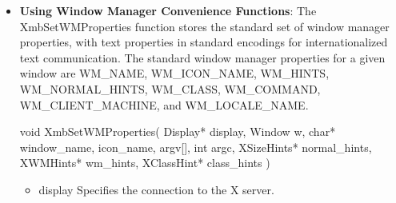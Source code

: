 \documentclass{report}
\begin{document}
\begin{itemize}
\begin{itemize}
            \bigbreak \noindent 
            To read a window’s WM\_ICON\_SIZE property, use XGetIconSizes
            \bigbreak \noindent 
            \begin{cppcode}
                Status XGetIconSizes(Display* display, Window w, XIconSize** size_list_return, int* count_return)
            \end{cppcode}
            \begin{itemize}
                \item display Specifies the connection to the X server.
                \item w Specifies the window.
                \item size\_list\_return Returns the size list.
                \item count\_return Returns the number of items in the size list
            \end{itemize}
            The XGetIconSizes function returns zero if a window manager has not set icon sizes; otherwise, it returns nonzero. XGetIconSizes should be called by an application that wants to find out what icon sizes would be most appreciated by the window manager under which the application is running. The application should then use XSetWMHints to supply the window manager with an icon pixmap or window in one of the supported sizes. To free the data allocated in size\_list\_return, use XFree.
            \bigbreak \noindent 
            XGetIconSizes can generate a BadWindow error.
        \item \textbf{Using Window Manager Convenience Functions}: The XmbSetWMProperties function stores the standard set of window manager properties, with text properties in standard encodings for internationalized text communication. The standard window manager properties for a given window are WM\_NAME, WM\_ICON\_NAME, WM\_HINTS, WM\_NORMAL\_HINTS, WM\_CLASS, WM\_COMMAND, WM\_CLIENT\_MACHINE, and WM\_LOCALE\_NAME.
            \bigbreak \noindent 
            \begin{cppcode}
            void XmbSetWMProperties(
                Display* display,
                Window w,
                char* window_name, icon_name, argv[],
                int argc,
                XSizeHints* normal_hints,
                XWMHints* wm_hints,
                XClassHint* class_hints
            )
            \end{cppcode}
            \begin{itemize}
                \item display Specifies the connection to the X server.

\end{itemize}
\end{itemize}
\end{itemize}
\end{document}
